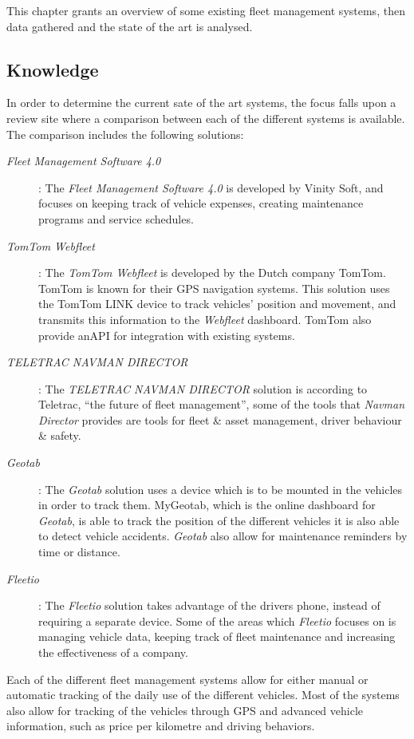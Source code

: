 This chapter grants an overview of some existing fleet management systems, then data gathered and the state of the art is analysed.

\subsection{Knowledge}\label{sub:Knowledge}
In order to determine the current sate of the art systems, the focus falls upon a review site where a comparison between each of the different systems is available\cite{top20fleetmanagement}.
The comparison includes the following solutions:
\begin{description}
    \item [\textit{Fleet Management Software 4.0}]\cite{vinitysoft}: The \textit{Fleet Management Software 4.0} is developed by Vinity Soft, and focuses on keeping track of vehicle expenses, creating maintenance programs and service schedules.
    \item [\textit{TomTom Webfleet}]\cite{tomtom}: The \textit{TomTom Webfleet} is developed by the Dutch company TomTom. TomTom is known for their GPS navigation systems. This solution uses the TomTom LINK device to track vehicles' position and movement, and transmits this information to the \textit{Webfleet} dashboard. TomTom also provide anAPI for integration with existing systems.
    \item [\textit{TELETRAC NAVMAN DIRECTOR}]\cite{teletracnavman}: The \textit{TELETRAC NAVMAN DIRECTOR} solution is according to Teletrac, \enquote{the future of fleet management}, some of the tools that \textit{Navman Director} provides are tools for fleet \& asset management, driver behaviour \& safety.
    \item [\textit{Geotab}]\cite{geotab}: The \textit{Geotab} solution uses a device which is to be mounted in the vehicles in order to track them. MyGeotab, which is the online dashboard for \textit{Geotab}, is able to track the position of the different vehicles it is also able to detect vehicle accidents.
    \textit{Geotab} also allow for maintenance reminders by time or distance.
    \item [\textit{Fleetio}]\cite{fleetio}: The \textit{Fleetio} solution takes advantage of the drivers phone, instead of requiring a separate device. Some of the areas which \textit{Fleetio} focuses on is managing vehicle data, keeping track of fleet maintenance and increasing the effectiveness of a company.
\end{description}
Each of the different fleet management systems allow for either manual or automatic tracking of the daily use of the different vehicles.
Most of the systems also allow for tracking of the vehicles through GPS and advanced vehicle information, such as price per kilometre and driving behaviors.

